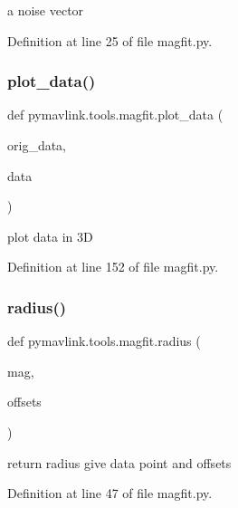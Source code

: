 \begin{DoxyVerb}a noise vector\end{DoxyVerb}
 

Definition at line 25 of file magfit.\+py.

\mbox{\label{namespacepymavlink_1_1tools_1_1magfit_a2689a4d34638be4aa45cf5592cc70b3f}} 
\subsubsection{\texorpdfstring{plot\_data()}{plot\_data()}}
{\footnotesize\ttfamily def pymavlink.\+tools.\+magfit.\+plot\+\_\+data (\begin{DoxyParamCaption}\item[{}]{orig\+\_\+data,  }\item[{}]{data }\end{DoxyParamCaption})}

\begin{DoxyVerb}plot data in 3D\end{DoxyVerb}
 

Definition at line 152 of file magfit.\+py.

\mbox{\label{namespacepymavlink_1_1tools_1_1magfit_a62287ea1457f17318d050e233a94c7d9}} 
\subsubsection{\texorpdfstring{radius()}{radius()}}
{\footnotesize\ttfamily def pymavlink.\+tools.\+magfit.\+radius (\begin{DoxyParamCaption}\item[{}]{mag,  }\item[{}]{offsets }\end{DoxyParamCaption})}

\begin{DoxyVerb}return radius give data point and offsets\end{DoxyVerb}
 

Definition at line 47 of file magfit.\+py.

\mbox{\label{namespacepymavlink_1_1tools_1_1magfit_aecea0b6954ec65248c3cd767cae448eb}} 
